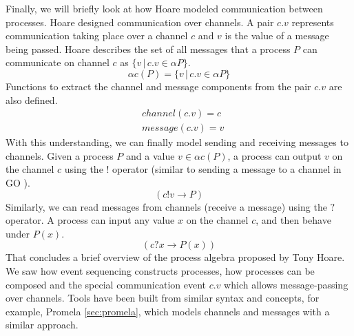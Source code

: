 \par
Finally, we will briefly look at how Hoare modeled communication between processes. Hoare designed communication over channels. A pair $c.v$ represents communication taking place over a channel $c$ and $v$ is the value of a message being passed. Hoare describes the set of all messages that a process $P$ can communicate on channel $c$ as $\{ v \,|\, c.v \in \alpha P \}.$
\[
\alpha c(P) = \{ v \,|\, c.v \in \alpha P \}
\]
Functions to extract the channel and message components from the pair $c.v$ are also defined.
\[
\begin{aligned}
& channel(c.v) = c \\
& message(c.v) = v
\end{aligned}
\]
With this understanding, we can finally model sending and receiving messages to channels. Given a process $P$ and a value $v \in \alpha c(P)$, a process can output $v$ on the channel $c$ using the $!$ operator (similar to sending a message to a channel in GO \cite{go}).
\[
(c!v \rightarrow P)
\]
Similarly, we can read messages from channels (receive a message) using the $?$ operator. A process can input any value $x$ on the channel $c$, and then behave under $P(x)$.
\[
(c?x \rightarrow P(x))
\]
That concludes a brief overview of the process algebra proposed by Tony Hoare. We saw how event sequencing constructs processes, how processes can be composed and the special communication event $c.v$ which allows message-passing over channels. Tools have been built from similar syntax and concepts, for example, Promela \ref{sec:promela}, which models channels and messages with a similar approach.
